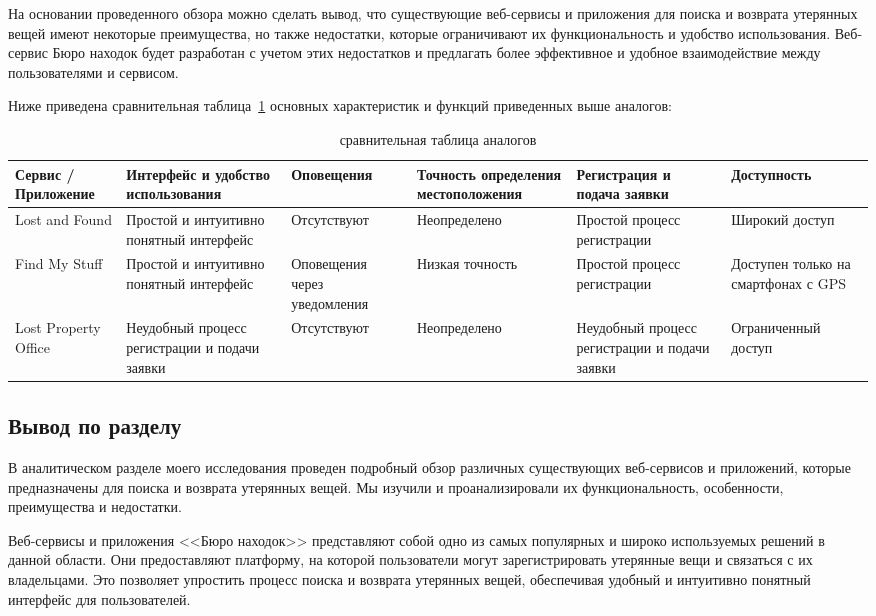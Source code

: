 \documentclass{mirea}
\begin{document}
На основании проведенного обзора можно сделать вывод, что существующие веб-сервисы и приложения для поиска и возврата утерянных вещей имеют некоторые преимущества, но также недостатки, которые ограничивают их функциональность и удобство использования. Веб-сервис Бюро находок будет разработан с учетом этих недостатков и предлагать более эффективное и удобное взаимодействие между пользователями и сервисом.

Ниже приведена сравнительная таблица~\ref{tab:analogs_comparison} основных характеристик и функций приведенных выше аналогов:
\begin{table}[htb]
	\caption{сравнительная таблица аналогов}
	\centering
	\begin{tabular}{ |p{2cm}|p{3cm}|p{2cm}|p{2cm}|p{3cm}|p{2cm}| } 
		\hline
		Сервис / Приложение & Интерфейс и удобство использования & Опове\-ще\-ния & Точность определения местоположения & Регистрация и подача заявки & Доступ\-ность \\ \hline
		
		Lost and Found & Простой и интуитивно понятный интерфейс & Отсут\-ству\-ют & Не\-оп\-ре\-де\-ле\-но & Простой процесс регистрации & Широкий доступ \\ \hline
		
		Find My Stuff & Простой и интуитивно понятный интерфейс & Опо\-ве\-ще\-ния через уведомления & Низкая точность & Простой процесс регистрации & Доступен только на смартфонах с GPS \\ \hline
		
		Lost Property Office & Неудобный процесс регистрации и подачи заявки & Отсут\-ству\-ют & Не\-оп\-ре\-де\-ле\-но & Неудобный процесс регистрации и подачи заявки & Огра\-ни\-чен\-ный доступ \\ \hline
	\end{tabular}
	\label{tab:analogs_comparison}
\end{table}

\subsection*{Вывод по разделу}

В аналитическом разделе моего исследования проведен подробный обзор различных существующих веб-сервисов и приложений, которые предназначены для поиска и возврата утерянных вещей. Мы изучили и проанализировали их функциональность, особенности, преимущества и недостатки.

Веб-сервисы и приложения <<Бюро находок>> представляют собой одно из самых популярных и широко используемых решений в данной области. Они предоставляют платформу, на которой пользователи могут зарегистрировать утерянные вещи и связаться с их владельцами. Это позволяет упростить процесс поиска и возврата утерянных вещей, обеспечивая удобный и интуитивно понятный интерфейс для пользователей.
\end{document}
